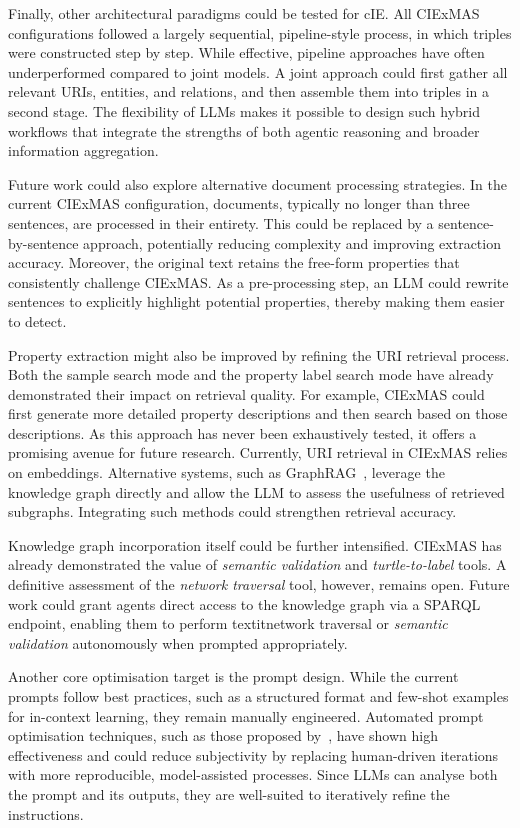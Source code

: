 \documentclass[a4paper,oneside,bibliography=totoc]{scrbook}
\begin{document}
Finally, other architectural paradigms could be tested for \ac{cIE}. All CIExMAS configurations followed a largely sequential, pipeline-style process, in which triples were constructed step by step. While effective, pipeline approaches have often underperformed compared to joint models. A joint approach could first gather all relevant \acp{URI}, entities, and relations, and then assemble them into triples in a second stage. The flexibility of \acp{LLM} makes it possible to design such hybrid workflows that integrate the strengths of both agentic reasoning and broader information aggregation.

Future work could also explore alternative document processing strategies. In the current CIExMAS configuration, documents, typically no longer than three sentences, are processed in their entirety. This could be replaced by a sentence-by-sentence approach, potentially reducing complexity and improving extraction accuracy. Moreover, the original text retains the free-form properties that consistently challenge CIExMAS. As a pre-processing step, an \ac{LLM} could rewrite sentences to explicitly highlight potential properties, thereby making them easier to detect.

Property extraction might also be improved by refining the \ac{URI} retrieval process. Both the sample search mode and the property label search mode have already demonstrated their impact on retrieval quality. For example, CIExMAS could first generate more detailed property descriptions and then search based on those descriptions. As this approach has never been exhaustively tested, it offers a promising avenue for future research. Currently, \ac{URI} retrieval in CIExMAS relies on embeddings. Alternative systems, such as GraphRAG~\cite{Edge2025}, leverage the knowledge graph directly and allow the \ac{LLM} to assess the usefulness of retrieved subgraphs. Integrating such methods could strengthen retrieval accuracy.

Knowledge graph incorporation itself could be further intensified. CIExMAS has already demonstrated the value of \textit{semantic validation} and \textit{turtle-to-label} tools. A definitive assessment of the \textit{network traversal} tool, however, remains open. Future work could grant agents direct access to the knowledge graph via a \ac{SPARQL} endpoint, enabling them to perform textit{network traversal} or \textit{semantic validation} autonomously when prompted appropriately.

Another core optimisation target is the prompt design. While the current prompts follow best practices, such as a structured format and few-shot examples for in-context learning, they remain manually engineered. Automated prompt optimisation techniques, such as those proposed by~\citet{Agrawal2025}, have shown high effectiveness and could reduce subjectivity by replacing human-driven iterations with more reproducible, model-assisted processes. Since \acp{LLM} can analyse both the prompt and its outputs, they are well-suited to iteratively refine the instructions.
\end{document}
